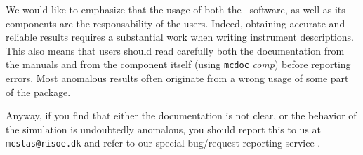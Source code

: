 We would like to emphasize that the usage of both the \MCS\ software, as well as its components are the responsability of the users. Indeed, obtaining accurate and reliable results requires a substantial work when writing instrument descriptions. This also means that users should read carefully both the documentation from the manuals \cite{mcstasmanual} and from the component itself (using \verb+mcdoc+ {\it comp}) before reporting errors. Most anomalous results often originate from a wrong usage of some part of the package.

Anyway, if you find that either the documentation is not clear, or the behavior of the simulation is undoubtedly anomalous, you should report this to us at \verb+mcstas@risoe.dk+ and refer to our special bug/request reporting service \cite{mczilla_webpage}.
